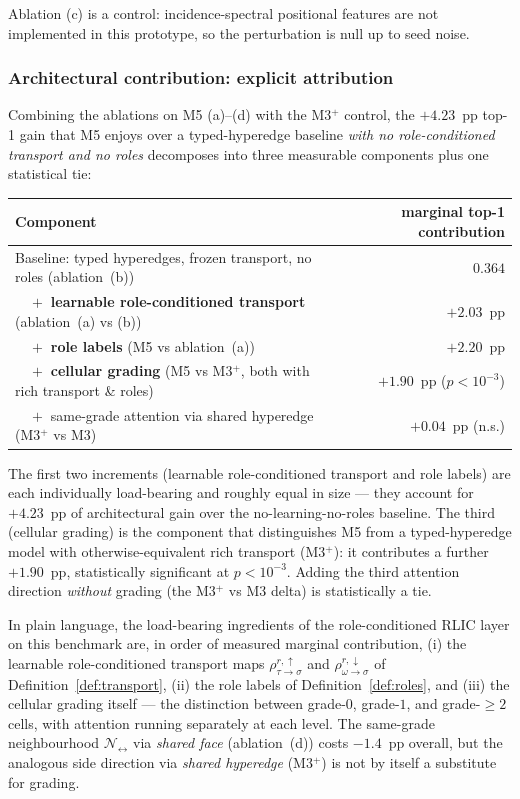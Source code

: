 \documentclass[11pt]{article}
\theoremstyle{definition}
\theoremstyle{plain}
\begin{document}
\noindent Ablation (c) is a control: incidence-spectral positional features
are not implemented in this prototype, so the perturbation is null up to
seed noise.

\subsubsection*{Architectural contribution: explicit attribution}

Combining the ablations on M5 (a)--(d) with the M3$^{+}$ control, the
$+4.23$~pp top-1 gain that M5 enjoys over a typed-hyperedge baseline
\emph{with no role-conditioned transport and no roles} decomposes into
three measurable components plus one statistical tie:

\begin{center}
\small
\begin{tabular}{lr}
\toprule
Component & marginal top-1 contribution \\
\midrule
Baseline: typed hyperedges, frozen transport, no roles (ablation~(b)) & $0.364$ \\
$\quad+$ \textbf{learnable role-conditioned transport} (ablation~(a) vs (b)) & $+2.03$~pp \\
$\quad+$ \textbf{role labels} (M5 vs ablation~(a)) & $+2.20$~pp \\
$\quad+$ \textbf{cellular grading} (M5 vs M3$^{+}$, both with rich transport \& roles) & $+1.90$~pp ($p < 10^{-3}$) \\
$\quad+$ same-grade attention via shared hyperedge (M3$^{+}$ vs M3) & $+0.04$~pp (n.s.) \\
\bottomrule
\end{tabular}
\end{center}

\noindent The first two increments (learnable role-conditioned transport
and role labels) are each individually load-bearing and roughly equal in
size — they account for $+4.23$~pp of architectural gain over the
no-learning-no-roles baseline. The third (cellular grading) is the
component that distinguishes M5 from a typed-hyperedge model with
otherwise-equivalent rich transport (M3$^{+}$): it contributes a further
$+1.90$~pp, statistically significant at $p < 10^{-3}$. Adding the
third attention direction \emph{without} grading (the M3$^{+}$ vs M3
delta) is statistically a tie.

In plain language, the load-bearing ingredients of the role-conditioned
RLIC layer on this benchmark are, in order of measured marginal
contribution, (i) the learnable role-conditioned transport maps
$\rho^{r,\uparrow}_{\tau \to \sigma}$ and $\rho^{r,\downarrow}_{\omega \to \sigma}$
of Definition~\ref{def:transport}, (ii) the role labels of
Definition~\ref{def:roles}, and (iii) the cellular grading itself — the
distinction between grade-$0$, grade-$1$, and grade-$\ge 2$ cells, with
attention running separately at each level. The same-grade neighbourhood
$\mathcal{N}_{\leftrightarrow}$ via \emph{shared face} (ablation~(d))
costs $-1.4$~pp overall, but the analogous side direction via
\emph{shared hyperedge} (M3$^{+}$) is not by itself a substitute for
grading.
\end{document}
